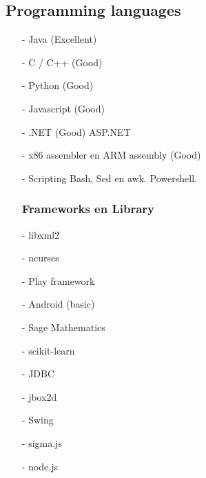 \documentclass[margin, 10pt]{res} %
\begin{document}
\subsection{Programming languages}
\begin{multicols}{2}
\begin{enumerate}
\item[-] Java (Excellent)
\item[-] C / C++ (Good)
\item[-] Python (Good)
\item[-] Javascript (Good)
\item[-] .NET (Good)
\subitem ASP.NET
\item[-] x86 assembler en ARM assembly (Good)
\item[-] Scripting
\subitem Bash, Sed en awk.
\subitem Powershell.
\subsubsection*{Frameworks en Library}
\item[-] libxml2
\item[-] ncurses
\item[-] Play framework
\item[-] Android (basic)
\item[-] Sage Mathematics
\item[-] scikit-learn
\item[-] JDBC
\item[-] jbox2d
\item[-] Swing
\item[-] sigma.js
\item[-] node.js
\end{enumerate}
\end{multicols}
\end{document}
